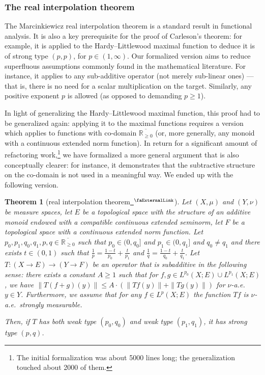 \documentclass[12pt, reqno]{amsart}
\newcommand*{\real}{\mathbb{R}} %
\newcommand{\ennreal}{\overline{\real_{\ge0}}}
\newcommand{\extlink}{~\ensuremath{{}^\text{\faExternalLink}}}
\theoremstyle{definition}
\theoremstyle{plain}
\newtheorem{theorem}{Theorem}[subsection]
\begin{document}
\subsubsection{The real interpolation theorem}\label{subsubsec:real_interpolation}
The Marcinkiewicz real interpolation theorem is a standard result in functional analysis.
It is also a key prerequisite for the proof of Carleson's theorem: for example, it is applied to the Hardy–Littlewood maximal function to deduce it is of strong type $(p, p)$, for $p\in(1,\infty)$.
Our formalized version aims to reduce superfluous assumptions commonly found in the mathematical literature. For instance, it applies to any sub-additive operator (not merely sub-linear ones) --- that is, there is no need for a scalar multiplication on the target. Similarly, any positive exponent $p$ is allowed (as opposed to demanding $p\geq 1$).

In light of generalizing the Hardy--Littlewood maximal function, this proof had to be generalized again:
applying it to the maximal functions requires a version which applies to functions with co-domain $\ennreal$ (or, more generally, any monoid with a continuous extended norm function).
In return for a significant amount of refactoring work,\footnote{The initial formalization was about 5000 lines long; the generalization touched about 2000 of them.}
we have formalized a more general argument that is also conceptually clearer: for instance, it demonstrates that the subtractive structure on the co-domain is not used in a meaningful way. We ended up with the following version.
\begin{theorem}[real interpolation theorem\href{https://github.com/fpvandoorn/carleson/blob/AFM-frozen/Carleson/ToMathlib/RealInterpolation/Main.lean\#L1439-L1448}{\extlink}]
    Let $(X,\mu)$ and $(Y,\nu)$ be measure spaces, let $E$ be a topological space with the structure of an additive monoid endowed with a compatible continuous extended seminorm, let $F$ be a topological space with a continuous extended norm function.
    Let $p_0, p_1, q_0, q_1, p, q \in \ennreal$ such that $p_0 \in (0,q_0]$ and $p_1 \in (0,q_1]$ and $q_0 \ne q_1$ and there exists $t \in (0,1)$ such that $\frac{1}{p} = \frac{1-t}{p_0} + \frac{t}{p_1}$ and $\frac{1}{q} = \frac{1-t}{q_0} + \frac{t}{q_1}$.
    Let $T\colon (X \to E) \to (Y \to F)$ be an operator that is subadditive in the following sense: there exists a constant $A \ge 1$ such that for $f, g \in L^{p_0}(X; E) \cup L^{p_1}(X; E)$, we have $\|T(f+g)(y)\| \le A \cdot \left(\|Tf(y)\| + \|Tg(y)\|\right)$ for $\nu$-a.e.\ $y\in Y$. Furthermore, we assume that for any $f\in L^p(X;E)$ the function $T f$ is $\nu$-a.e.\ strongly measurable.

Then, if $T$ has both weak type $(p_0, q_0)$ and weak type $(p_1, q_1)$, it has strong type $(p,q)$.
\end{theorem}
\end{document}
